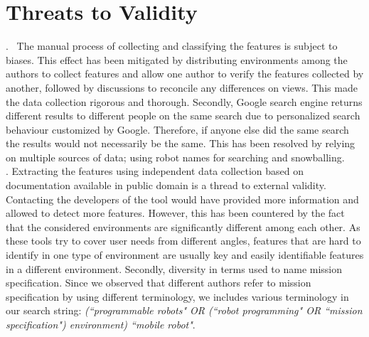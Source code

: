 \section{Threats to Validity}
. \
The manual process of collecting and classifying  the features is subject to biases.
This effect has been mitigated by distributing environments among the authors to collect features and allow one author to verify the features collected by another, followed by discussions to reconcile any differences on views. This made the data collection rigorous and thorough. Secondly, Google search engine returns different results to different people on the same search due to personalized search behaviour customized by Google. Therefore, if anyone else did the same search the results would not necessarily be the same. This has been resolved by relying on multiple sources of data; using robot names for searching and snowballing.\\
\parheadit{Threads to external validity}. Extracting the features using independent data collection based on documentation available in public domain is a thread to external validity. Contacting the developers of the tool would have provided more information and allowed to detect more features. 
However, this has been countered by the fact that the considered environments are significantly different among each other. As these tools try to cover user needs from different angles, features that are hard to identify in one type of environment are usually key and easily identifiable features in a different environment.
Secondly, diversity in terms used to name mission specification. Since we observed that different authors refer to mission specification by using different terminology, we includes various terminology in our search string: \emph{(``programmable robots" OR (``robot programming" OR ``mission specification") environment) ``mobile robot"}. 
